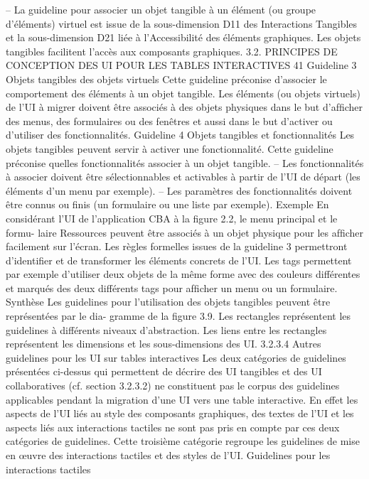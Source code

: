 \documentclass{article}
\begin{document}
– La guideline pour associer un objet tangible à un élément (ou groupe d’éléments) virtuel est
issue de la sous-dimension D11 des Interactions Tangibles et la sous-dimension D21 liée à
l’Accessibilité des éléments graphiques. Les objets tangibles facilitent l’accès aux composants
graphiques.
3.2. PRINCIPES DE CONCEPTION DES UI POUR LES TABLES INTERACTIVES
41
Guideline 3 Objets tangibles des objets virtuels
Cette guideline préconise d’associer le comportement des éléments à un objet
tangible. Les éléments (ou objets virtuels) de l’UI à migrer doivent être associés
à des objets physiques dans le but d’afﬁcher des menus, des formulaires ou des
fenêtres et aussi dans le but d’activer ou d’utiliser des fonctionnalités.
Guideline 4 Objets tangibles et fonctionnalités
Les objets tangibles peuvent servir à activer une fonctionnalité. Cette guideline
préconise quelles fonctionnalités associer à un objet tangible.
– Les fonctionnalités à associer doivent être sélectionnables et activables à partir
de l’UI de départ (les éléments d’un menu par exemple).
– Les paramètres des fonctionnalités doivent être connus ou ﬁnis (un formulaire
ou une liste par exemple).
Exemple
En considérant l’UI de l’application CBA à la ﬁgure 2.2, le menu principal et le formu-
laire Ressources peuvent être associés à un objet physique pour les afﬁcher facilement sur l’écran.
Les règles formelles issues de la guideline 3 permettront d’identiﬁer et de transformer les éléments
concrets de l’UI. Les tags permettent par exemple d’utiliser deux objets de la même forme avec des
couleurs différentes et marqués des deux différents tags pour afﬁcher un menu ou un formulaire.
Synthèse
Les guidelines pour l’utilisation des objets tangibles peuvent être représentées par le dia-
gramme de la ﬁgure 3.9. Les rectangles représentent les guidelines à différents niveaux d’abstraction.
Les liens entre les rectangles représentent les dimensions et les sous-dimensions des UI.
3.2.3.4
Autres guidelines pour les UI sur tables interactives
Les deux catégories de guidelines présentées ci-dessus qui permettent de décrire des UI tangibles
et des UI collaboratives (cf. section 3.2.3.2) ne constituent pas le corpus des guidelines applicables
pendant la migration d’une UI vers une table interactive. En effet les aspects de l’UI liés au style des
composants graphiques, des textes de l’UI et les aspects liés aux interactions tactiles ne sont pas pris
en compte par ces deux catégories de guidelines. Cette troisième catégorie regroupe les guidelines de
mise en œuvre des interactions tactiles et des styles de l’UI.
Guidelines pour les interactions tactiles
\end{document}
